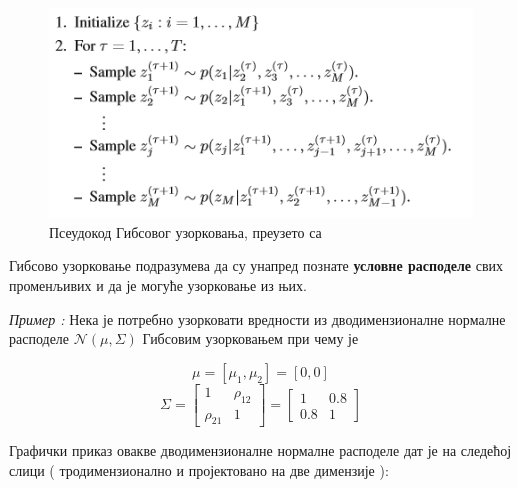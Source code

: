 \begin{figure}[H]
    \centering
\captionsetup{justification=centering}
   \includegraphics[scale=0.8]{./Slike/slika21.png} 
	\caption{Псеудокод Гибсовог узорковања, преузето са \cite{verov7}} 
	\label{fig:slika20}
\end{figure}


Гибсово узорковање подразумева да су унапред познате  \textbf{условне расподеле} свих променљивих и да је могуће узорковање из њих.

\textit{Пример :} Нека је потребно узорковати вредности из дводимензионалне нормалне расподеле $ \mathcal{N}(\mu, \Sigma )$ Гибсовим узорковањем при чему је 

$$\mu = [\mu_1,\mu_2] = [0,0]$$
$$\Sigma = \left[
\begin{array}{cc}
1 & \rho_{12} \\
\rho_{21} & 1
\end{array}
\right] =  \left[
\begin{array}{cc}
1 & 0.8 \\
0.8 & 1
\end{array}
\right]$$

Графички приказ овакве дводимензионалне нормалне расподеле дат је на следећој слици ( тродимензионално и пројектовано на две димензије ):

